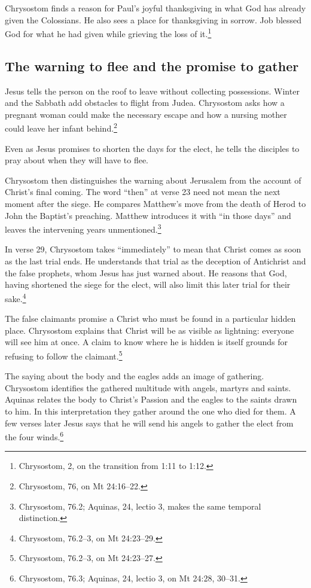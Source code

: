 Chrysostom finds a reason for Paul's joyful thanksgiving in what
God has already given the Colossians. He also sees a place for
thanksgiving in sorrow. Job blessed God for what he had given
while grieving the loss of it.\footnote{Chrysostom,
 2, on the transition from 1:11 to 1:12.}

\subsection{The warning to flee and the promise to gather}

Jesus tells the person on the roof to leave without collecting
possessions. Winter and the Sabbath add obstacles to flight from
Judea. Chrysostom asks how a pregnant woman could make the necessary
escape and how a nursing mother could leave her infant
behind.\footnote{Chrysostom,
 76, on Mt 24:16--22.}

Even as Jesus promises to shorten the days for the elect, he tells
the disciples to pray about when they will have to flee.

Chrysostom then distinguishes the warning about Jerusalem from
the account of Christ's final coming. The word ``then'' at
verse 23 need not mean the next moment after the siege. He
compares Matthew's move from the death of Herod to John the
Baptist's preaching. Matthew introduces it with ``in those days''
and leaves the intervening years unmentioned.\footnote{Chrysostom,
 76.2; Aquinas,
 24, lectio 3, makes the same temporal
distinction.}

In verse 29, Chrysostom takes ``immediately'' to mean that Christ
comes as soon as the last trial ends. He understands that trial as
the deception of Antichrist and the false prophets, whom Jesus has
just warned about. He reasons
that God, having shortened the siege for the elect, will also limit
this later trial for their sake.\footnote{Chrysostom,
 76.2--3, on Mt 24:23--29.}

The false claimants promise a Christ who must be found in a
particular hidden place. Chrysostom explains that Christ will be
as visible as lightning: everyone will see him at once. A claim
to know where he is hidden is itself grounds for refusing to
follow the claimant.\footnote{Chrysostom,
 76.2--3, on Mt 24:23--27.}

The saying about the body and the eagles adds an image of gathering.
Chrysostom identifies the gathered multitude with angels, martyrs and
saints. Aquinas relates the body to Christ's Passion and the eagles to
the saints drawn to him. In this interpretation they gather around
the one who died for them. A few verses later Jesus says that he will
send his angels to gather the elect from the four winds.\footnote{Chrysostom,
 76.3; Aquinas, 
24, lectio 3, on Mt 24:28, 30--31.}

